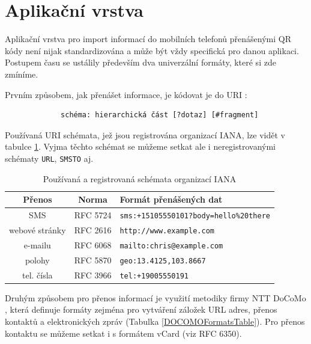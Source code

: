 \section{Aplikační vrstva}
\label{aplikacniVrstva}

Aplikační vrstva pro import informací do mobilních telefonů přenášenými QR kódy 
není nijak standardizována a může být vždy specifická pro danou aplikaci. 
Postupem času se ustálily především dva univerzální formáty, které si zde 
zmíníme.

\bigskip \noindent Prvním způsobem, jak přenášet informace, je kódovat je do URI
\cite{zxingContents,sixrevisionsURI}:

\begin{verbatim}
             schéma: hierarchická část [?dotaz] [#fragment]
\end{verbatim}

Používaná URI schémata, jež jsou registrována organizací IANA, lze vidět v
tabulce \ref{URISChemes}. Vyjma těchto schémat se můžeme setkat ale i
neregistrovanými schématy \texttt{URL}, \texttt{SMSTO} aj.

\begin{table}[H]
  \begin{center} 
    \begin{tabular}{| c | c | l |} \hline
    \textbf{Přenos} & \textbf{Norma} & \textbf{Formát přenášených dat} \\ \hline
    SMS & RFC 5724 & \texttt{sms:+15105550101?body=hello\%20there} \\ \hline
    webové stránky & RFC 2616 & \texttt{http://www.example.com} \\ \hline
    e-mailu & RFC 6068 & \texttt{mailto:chris@example.com} \\ \hline
    polohy & RFC 5870 & \texttt{geo:13.4125,103.8667} \\ \hline
    tel. čísla & RFC 3966 & \texttt{tel:+19005550191} \\ \hline
    \end{tabular}
    \caption{Používaná a registrovaná schémata organizací IANA}
    \label{URISChemes}
  \end{center}
\end{table}

Druhým způsobem pro přenos informací je využití metodiky firmy NTT DoCoMo
\cite{DOCOMOFormatsLiterature}, která definuje formáty zejména pro vytváření
záložek URL adres, přenos kontaktů a elektronických zpráv (Tabulka
\ref{DOCOMOFormatsTable}). Pro přenos kontaktu se můžeme setkat i s formátem
vCard (viz RFC 6350).

